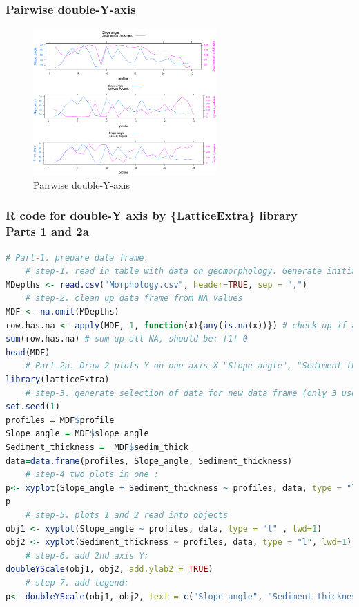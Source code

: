 \documentclass[pdflatex,compress,10pt,
	xcolor={dvipsnames,dvipsnames,svgnames,x11names,table},
	hyperref={colorlinks = true,breaklinks = true, urlcolor = NavyBlue, breaklinks = true}]{beamer}
\begin{document}
\begin{frame}\frametitle{Pairwise double-Y-axis}
\begin{figure}[H]
	\centering
		\includegraphics[width=7cm]{Fig-3-8a.jpg}
	\caption{Pairwise double-Y-axis}
\end{figure}		
\end{frame}

\begin{frame}[fragile]\frametitle{R code for double-Y axis by \{LatticeExtra\} library\\ Parts 1 and 2a}
\begin{lstlisting}[language=R]
	# Part-1. prepare data frame. 
	# step-1. read in table with data on geomorphology. Generate initial data frame
MDepths <- read.csv("Morphology.csv", header=TRUE, sep = ",")
	# step-2. clean up data frame from NA values
MDF <- na.omit(MDepths) 
row.has.na <- apply(MDF, 1, function(x){any(is.na(x))}) # check up if any NA area available
sum(row.has.na) # sum up all NA, should be: [1] 0
head(MDF) 
	# Part-2а. Draw 2 plots Y on one axis X "Slope angle", "Sediment thickness"
library(latticeExtra) 
	# step-3. generate selection of data for new data frame (only 3 useful values)
set.seed(1)
profiles = MDF$profile
Slope_angle = MDF$slope_angle
Sediment_thickness =  MDF$sedim_thick
data=data.frame(profiles, Slope_angle, Sediment_thickness)
	# step-4 two plots in one :
p<- xyplot(Slope_angle + Sediment_thickness ~ profiles, data, type = "l")
p		
	# step-5. plots 1 and 2 read into objects
obj1 <- xyplot(Slope_angle ~ profiles, data, type = "l" , lwd=1)
obj2 <- xyplot(Sediment_thickness ~ profiles, data, type = "l", lwd=1)
	# step-6. add 2nd axis Y:
doubleYScale(obj1, obj2, add.ylab2 = TRUE)
	# step-7. add legend:
p<- doubleYScale(obj1, obj2, text = c("Slope angle", "Sediment thickness"), add.ylab2 = TRUE) 
\end{lstlisting}
\end{frame}
\end{document}
